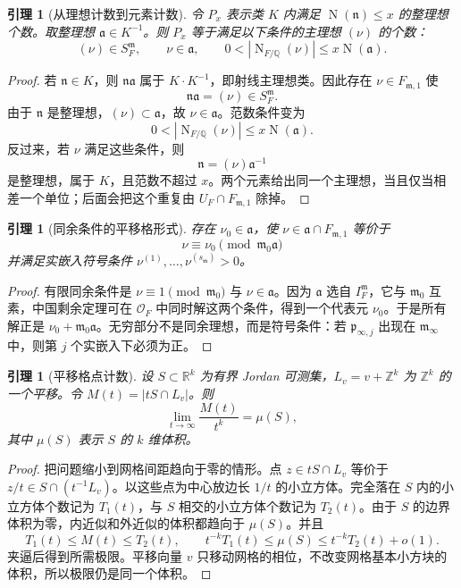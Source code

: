 \documentclass[11pt,a4paper,openany]{ctexbook}
\numberwithin{equation}{chapter}
\newcommand{\Q}{\mathbb{Q}}
\newcommand{\R}{\mathbb{R}}
\newcommand{\Z}{\mathbb{Z}}
\newcommand{\OF}{\mathcal{O}_F}
\newcommand{\Nm}{\operatorname{N}}
\theoremstyle{plain}
\newtheorem{lemma}[theorem]{引理}
\theoremstyle{definition}
\theoremstyle{remark}
\begin{document}
\begin{lemma}[从理想计数到元素计数]
令 $P_x$ 表示类 $K$ 内满足 $\Nm(\mathfrak n)\le x$ 的整理想个数。取整理想
$\mathfrak a\in K^{-1}$。则 $P_x$ 等于满足以下条件的主理想 $(\nu)$ 的个数：
\[
(\nu)\in S_F^{\mathfrak m},\qquad
\nu\in\mathfrak a,\qquad
0<|\Nm_{F/\Q}(\nu)|\le x\Nm(\mathfrak a).
\]
\end{lemma}

\begin{proof}
若 $\mathfrak n\in K$，则 $\mathfrak n\mathfrak a$ 属于
$K\cdot K^{-1}$，即射线主理想类。因此存在
$\nu\in F_{\mathfrak m,1}$ 使
\[
\mathfrak n\mathfrak a=(\nu)\in S_F^{\mathfrak m}.
\]
由于 $\mathfrak n$ 是整理想，$(\nu)\subset\mathfrak a$，故
$\nu\in\mathfrak a$。范数条件变为
\[
0<|\Nm_{F/\Q}(\nu)|\le x\Nm(\mathfrak a).
\]
反过来，若 $\nu$ 满足这些条件，则
\[
\mathfrak n=(\nu)\mathfrak a^{-1}
\]
是整理想，属于 $K$，且范数不超过 $x$。两个元素给出同一个主理想，当且仅当相差一个单位；后面会把这个重复由
$U_F\cap F_{\mathfrak m,1}$ 除掉。
\end{proof}

\begin{lemma}[同余条件的平移格形式]
存在 $\nu_0\in\mathfrak a$，使 $\nu\in\mathfrak a\cap F_{\mathfrak m,1}$ 等价于
\[
\nu\equiv\nu_0\pmod{\mathfrak m_0\mathfrak a}
\]
并满足实嵌入符号条件
$\nu^{(1)},\dots,\nu^{(s_{\mathfrak m})}>0$。
\end{lemma}

\begin{proof}
有限同余条件是
$\nu\equiv1\pmod{\mathfrak m_0}$ 与 $\nu\in\mathfrak a$。因为
$\mathfrak a$ 选自 $I_F^{\mathfrak m}$，它与 $\mathfrak m_0$ 互素，中国剩余定理可在
$\OF$ 中同时解这两个条件，得到一个代表元 $\nu_0$。于是所有解正是
$\nu_0+\mathfrak m_0\mathfrak a$。无穷部分不是同余理想，而是符号条件：若
$\mathfrak p_{\infty,j}$ 出现在 $\mathfrak m_\infty$ 中，则第 $j$ 个实嵌入下必须为正。
\end{proof}

\begin{lemma}[平移格点计数]
设 $S\subset\R^k$ 为有界 Jordan 可测集，$L_v=v+\Z^k$ 为 $\Z^k$ 的一个平移。令
$M(t)=|tS\cap L_v|$。则
\[
\lim_{t\to\infty}\frac{M(t)}{t^k}=\mu(S),
\]
其中 $\mu(S)$ 表示 $S$ 的 $k$ 维体积。
\end{lemma}

\begin{proof}
把问题缩小到网格间距趋向于零的情形。点 $z\in tS\cap L_v$ 等价于
$z/t\in S\cap (t^{-1}L_v)$。以这些点为中心放边长 $1/t$ 的小立方体。完全落在
$S$ 内的小立方体个数记为 $T_1(t)$，与 $S$ 相交的小立方体个数记为
$T_2(t)$。由于 $S$ 的边界体积为零，内近似和外近似的体积都趋向于
$\mu(S)$。并且
\[
T_1(t)\le M(t)\le T_2(t),\qquad
t^{-k}T_1(t)\le \mu(S)\le t^{-k}T_2(t)+o(1).
\]
夹逼后得到所需极限。平移向量 $v$ 只移动网格的相位，不改变网格基本小方块的体积，所以极限仍是同一个体积。
\end{proof}
\end{document}

